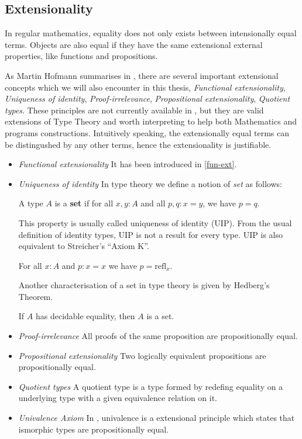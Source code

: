 \subsection{Extensionality}
\label{extensionality}

In regular mathematics, equality does not only exists between intensionally equal terms. Objects are also equal if they have the same extensional external properties, like functions and propositions. 

As Martin Hofmann summarises in \cite{hof:phd}, there are several important extensional concepts which we will also encounter in this thesis, \emph{Functional extensionality}, \emph{Uniqueness of identity}, \emph{Proof-irrelevance}, \emph{Propositional extensionality}, \emph{Quotient types}. 
These principles are not currently available in \itt, but they are valid extensions of Type Theory and worth interpreting to help both Mathematics and programs constructions. Intuitively speaking, the extensionally equal terms can be distingushed by any other terms, hence the extensionality is justifiable. 

\begin{itemize}
\item \textit{Functional extensionality} It has been introduced in \ref{fun-ext}.

\item \textit{Uniqueness of identity} In type theory we define a notion of \emph{set} as follows:

\begin{definition}\label{UIP}
A type $A$ is a \textbf{set} if for all $x,y:A$ and all $p,q:x=y$, we have $p=q$.
\end{definition}

This property is usually called uniqueness of identity (UIP). From the usual definition of identity types, UIP is not a result for every type. UIP is also equivalent to Streicher’s “Axiom K”.

\begin{axiom}[K]
For all $x:A$ and $p: x=x$ we have $p=\text{refl}_{x}$.
\end{axiom}

Another characterisation of a set in type theory is given by Hedberg's Theorem.
\begin{theorem}[Hedberg]
If $A$ has decidable equality, then $A$ is a set.
\end{theorem}

\item \textit{Proof-irrelevance} All proofs of the same proposition are propositionally equal.

\item \textit{Propositional extensionality} Two logically equivalent propositions are propositionally equal.

\item \textit{Quotient types} A quotient type is a type formed by redefing equality on a underlying type with a given equivalence relation on it. 

\item \textit{Univalence Axiom}
In \hott, univalence is a extensional principle which states that ismorphic types are propositionally equal.
\end{itemize}

